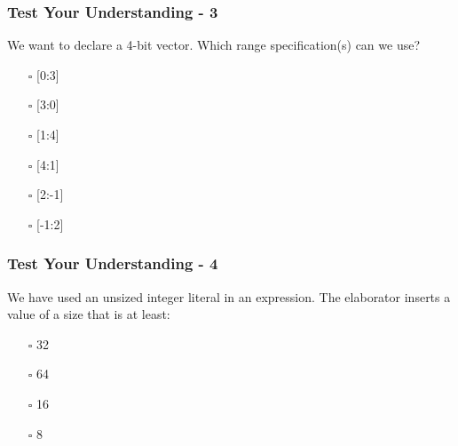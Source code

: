 \documentclass[t, notes, xcolor=table]{beamer}
\begin{document}

\begin{frame}
\frametitle{Test Your Understanding - 3}
We want to declare a 4-bit vector. Which range specification(s) can we use?
\begin{itemize}
\item[$\square$] {[0:3]}
\item[$\square$] {[3:0]}
\item[$\square$] {[1:4]}
\item[$\square$] {[4:1]}
\item[$\square$] {[2:-1]}
\item[$\square$] {[-1:2]}
\end{itemize}
\end{frame}


\begin{frame}
\frametitle{Test Your Understanding - 4}
We have used an unsized integer literal in an expression. The elaborator inserts a value of a size that is at least:
\begin{itemize}
\item[$\square$] 32
\item[$\square$] 64
\item[$\square$] 16
\item[$\square$] 8
\end{itemize}
\end{frame}
\end{document}
